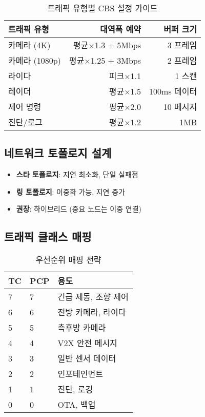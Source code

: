 \documentclass[twocolumn,10pt]{article}
\begin{document}
\begin{table}[h]
\centering
\caption{트래픽 유형별 CBS 설정 가이드}
\label{tab:cbs_guide}
\begin{tabular}{lrr}
\toprule
\textbf{트래픽 유형} & \textbf{대역폭 예약} & \textbf{버퍼 크기} \\
\midrule
카메라 (4K) & 평균×1.3 + 5Mbps & 3 프레임 \\
카메라 (1080p) & 평균×1.25 + 3Mbps & 2 프레임 \\
라이다 & 피크×1.1 & 1 스캔 \\
레이더 & 평균×1.5 & 100ms 데이터 \\
제어 명령 & 평균×2.0 & 10 메시지 \\
진단/로그 & 평균×1.2 & 1MB \\
\bottomrule
\end{tabular}
\end{table}

\subsection{네트워크 토폴로지 설계}

\begin{itemize}
    \item \textbf{스타 토폴로지}: 지연 최소화, 단일 실패점
    \item \textbf{링 토폴로지}: 이중화 가능, 지연 증가
    \item \textbf{권장}: 하이브리드 (중요 노드는 이중 연결)
\end{itemize}

\subsection{트래픽 클래스 매핑}

\begin{table}[h]
\centering
\caption{우선순위 매핑 전략}
\label{tab:priority_mapping}
\begin{tabular}{lll}
\toprule
\textbf{TC} & \textbf{PCP} & \textbf{용도} \\
\midrule
7 & 7 & 긴급 제동, 조향 제어 \\
6 & 6 & 전방 카메라, 라이다 \\
5 & 5 & 측후방 카메라 \\
4 & 4 & V2X 안전 메시지 \\
3 & 3 & 일반 센서 데이터 \\
2 & 2 & 인포테인먼트 \\
1 & 1 & 진단, 로깅 \\
0 & 0 & OTA, 백업 \\
\bottomrule
\end{tabular}
\end{table}
\end{document}

